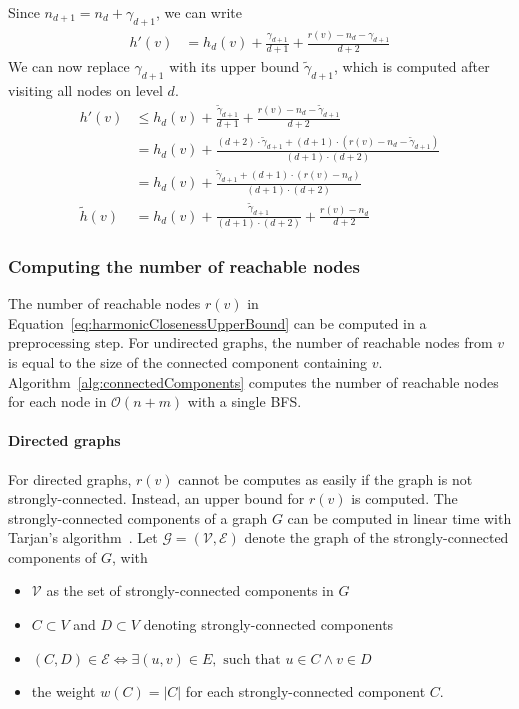 Since $n_{d + 1} = n_d + \gamma_{d+1}$, we can write
\begin{align}
	         h'(v)   &= h_d(v) + \frac{\gamma_{d+1}}{d+1} + \frac{r(v) - n_{d} - \gamma_{d+1}}{d+2}
\end{align}
We can now replace $\gamma_{d+1}$ with its upper bound $\widetilde{\gamma}_{d+1}$, which is computed after visiting all nodes on level $d$.
\begin{align}
	          h'(v)  &\leq h_d(v) + \frac{\widetilde{\gamma}_{d+1}}{d+1} + \frac{r(v) - n_{d} - \widetilde{\gamma}_{d+1}}{d+2} \label{eq:harmonicClosenessEstimate} \\
	                 &= h_d(v) + \frac{(d + 2) \cdot \widetilde{\gamma}_{d+1} + (d+1) \cdot \left(r(v) - n_{d} - \widetilde{\gamma}_{d+1}\right)}{(d+1) \cdot (d+2)} \\
	                 &= h_d(v) + \frac{\widetilde{\gamma}_{d+1} + (d+1) \cdot \left(r(v) - n_{d} \right)}{(d+1) \cdot (d+2)} \\
  \widetilde{h}(v)   &= h_d(v) + \frac{\widetilde{\gamma}_{d+1}}{(d+1) \cdot (d+2)} + \frac{r(v) - n_{d}}{d+2} \label{eq:harmonicClosenessUpperBound}
  \end{align}

\subsubsection{Computing the number of reachable nodes}
\label{sec:reachableNodes}
The number of reachable nodes $r(v)$ in Equation~\ref{eq:harmonicClosenessUpperBound} can be computed in a preprocessing step. For undirected graphs, the number of reachable nodes from $v$ is equal to the size of the connected component containing $v$. Algorithm~\ref{alg:connectedComponents} computes the number of reachable nodes for each node in $\mathcal{O}(n + m)$ with a single BFS.

\paragraph{Directed graphs}
 For directed graphs, $r(v)$ cannot be computes as easily if the graph is not strongly-connected. Instead, an upper bound for $r(v)$ is computed. The strongly-connected components of a graph $G$ can be computed in linear time with Tarjan's algorithm~\cite{tarjan1972depth}. Let $\mathcal{G = (V, E)}$ denote the graph of the strongly-connected components of $G$, with
 
 \begin{itemize}
 	\item $\mathcal{V}$ as the set of strongly-connected components in $G$
 	\item $C \subset V$ and $D \subset V$ denoting strongly-connected components
 	\item $(C, D) \in \mathcal{E} \iff \exists (u, v) \in E, \text{ such that } u \in C \land v \in D$ 
 	\item the weight $w(C) = |C|$ for each strongly-connected component $C$.
 \end{itemize}
 
